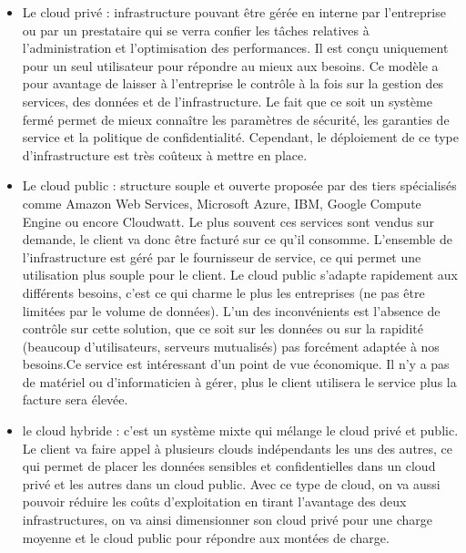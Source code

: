 \documentclass[]{article}
\begin{document}
\begin{itemize}
\item
  Le cloud privé : infrastructure pouvant être gérée en interne par
  l'entreprise ou par un prestataire qui se verra confier les tâches
  relatives à l'administration et l'optimisation des performances. Il
  est conçu uniquement pour un seul utilisateur pour répondre au mieux
  aux besoins. Ce modèle a pour avantage de laisser à l'entreprise le
  contrôle à la fois sur la gestion des services, des données et de
  l'infrastructure. Le fait que ce soit un système fermé permet de mieux
  connaître les paramètres de sécurité, les garanties de service et la
  politique de confidentialité. Cependant, le déploiement de ce type
  d'infrastructure est très coûteux à mettre en place.
 
\item
  Le cloud public : structure souple et ouverte proposée par des tiers
  spécialisés comme Amazon Web Services, Microsoft Azure, IBM, Google
  Compute Engine ou encore Cloudwatt. Le plus souvent ces services sont
  vendus sur demande, le client va donc être facturé sur ce qu'il
  consomme. L'ensemble de l'infrastructure est géré par le fournisseur
  de service, ce qui permet une utilisation plus souple pour le client.
  Le cloud public s'adapte rapidement aux différents besoins, c'est ce
  qui charme le plus les entreprises (ne pas être limitées par le volume
  de données). L'un des inconvénients est l'absence de contrôle sur
  cette solution, que ce soit sur les données ou sur la rapidité (beaucoup
  d'utilisateurs, serveurs mutualisés) pas forcément adaptée à nos
  besoins.Ce service est intéressant d'un point de vue économique. Il n'y a pas de matériel
  ou d'informaticien à gérer, plus le client utilisera le service
  plus la facture sera élevée.
  
\item
  le cloud hybride : c'est un système mixte qui mélange le cloud privé et
  public. Le client va faire appel à plusieurs clouds indépendants les
  uns des autres, ce qui permet de placer les données sensibles et
  confidentielles dans un cloud privé et les autres dans un cloud
  public. Avec ce type de cloud, on va aussi pouvoir réduire les coûts
  d'exploitation en tirant l'avantage des deux infrastructures, on va
  ainsi dimensionner son cloud privé pour une charge moyenne et le cloud
  public pour répondre aux montées de charge.
\end{itemize}
\end{document}
